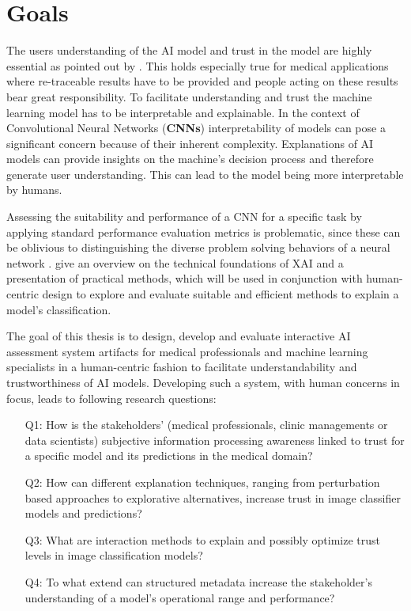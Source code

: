 \documentclass[11pt,a4paper,english]{scrreprt}
\begin{document}
\section{Goals}\label{section:goals}
The users understanding of the AI model and trust in the model are highly essential as pointed out by \textcite{knapic_explainable_2021}. This holds especially true for medical applications where re-traceable results have to be provided and people acting on these results bear great responsibility. To facilitate understanding and trust the machine learning model has to be interpretable and explainable. In the context of Convolutional Neural Networks (\textbf{CNNs}) interpretability of models can pose a significant concern because of their inherent complexity. Explanations of AI models can provide insights on the machine's decision process and therefore generate user understanding. This can lead to the model being more interpretable by humans.

Assessing the suitability and performance of a CNN for a specific task by applying standard performance evaluation metrics is problematic, since these can be oblivious to distinguishing the diverse problem solving behaviors of a neural network \parencite{lapuschkin_unmasking_2019}. \textcite{samek_explaining_2021,JMLR:v17:15-618,ribeiro_anchors_2018} give an overview on the technical foundations of XAI and a presentation of practical methods, which will be used in conjunction with human-centric design to explore and evaluate suitable and efficient methods to explain a model's classification.

The goal of this thesis is to design, develop and evaluate interactive AI assessment system artifacts for medical professionals and machine learning specialists in a human-centric fashion to facilitate understandability and trustworthiness of AI models. Developing such a system, with human concerns in focus, leads to following research questions:
\begin{itemize}
    \item[Q1:] How is the stakeholders' (medical professionals, clinic managements or data scientists) subjective information processing awareness linked to trust for a specific model and its predictions in the medical domain?
    \item[Q2:] How can different explanation techniques, ranging from perturbation based approaches to explorative alternatives, increase trust in image classifier models and predictions?
    \item[Q3:] What are interaction methods to explain and possibly optimize trust levels in image classification models?
    \item[Q4:] To what extend can structured metadata increase the stakeholder's understanding of a model's operational range and performance?
\end{itemize}
\end{document}

